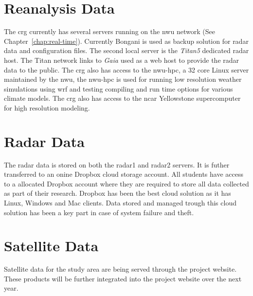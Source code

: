 \documentclass{wrcreport}
\begin{document}
\section{Reanalysis Data} The \gls{crg} currently has several servers
running on the \gls{nwu} network (See Chapter~\ref{chap:real-time}).
Currently Bongani is used as backup solution for radar data and
configuration files. The second local server is the \textit{Titan5}
dedicated radar host. The Titan network links to \textit{Gaia} used as
a web host to provide the radar data to the public. The \gls{crg} also
has access to the \gls{nwu-hpc}, a 32 core Linux server maintained by
the \gls{nwu}, the \gls{nwu-hpc} is used for running low resolution
weather simulations using \gls{wrf} and testing compiling and run time
options for various climate models.  The \gls{crg} also has access to
the \gls{ncar} Yellowstone supercomputer for high resolution modeling.

\section{Radar Data} The radar data is stored on both the radar1 and
radar2 servers. It is futher transferred to an onine Dropbox cloud
storage account. All students have access to a allocated Dropbox
account where they are required to store all data collected as part of
their research. Dropbox has been the best cloud solution as it has
Linux, Windows and Mac clients. Data stored and managed trough this
cloud solution has been a key part in case of system failure and
theft.

\section{Satellite Data} Satellite data for the study area are being
served through the project website. These products will be further
integrated into the project website over the next year.
\end{document}
